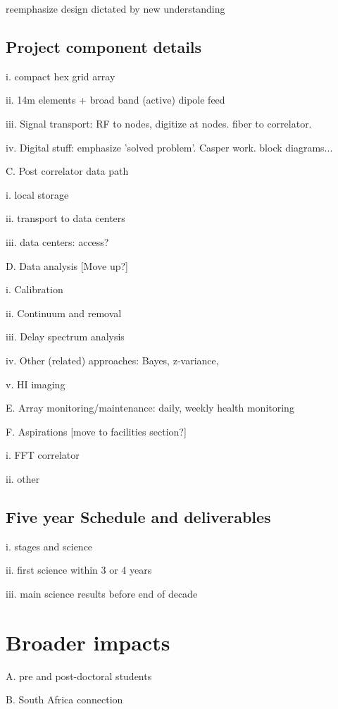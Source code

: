 \documentclass[preprint]{aastex}
\begin{document}
reemphasize design dictated by new understanding

\subsection{Project component details}  %

i. compact hex grid array

ii. 14m elements + broad band (active) dipole feed

iii. Signal transport: RF to nodes, digitize at nodes. fiber to correlator. 

iv. Digital stuff: emphasize 'solved problem'. Casper work. block diagrams...

C. Post correlator data path

i. local storage

ii. transport to data centers

iii. data centers: access? 

D. Data analysis [Move up?]

i. Calibration 

ii. Continuum and removal

iii. Delay spectrum analysis

iv. Other (related) approaches: Bayes, z-variance,

v. HI imaging

E. Array monitoring/maintenance: daily, weekly health monitoring

F. Aspirations [move to facilities section?]

i. FFT correlator

ii. other

\subsection{Five year Schedule and deliverables} %

i. stages and science

ii. first science within 3 or 4 years

iii. main science results before end of decade


\section{Broader impacts} %

A. pre and post-doctoral students

B. South Africa connection
\end{document}
